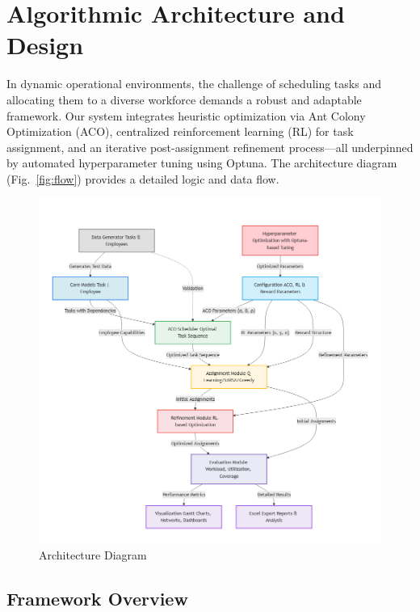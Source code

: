 \documentclass[%
aip,
cp,  %
amsmath,amssymb,
reprint,%
]{revtex4-2}
\begin{document}
	\section{\label{sec:algo}Algorithmic Architecture and Design}
	
	In dynamic operational environments, the challenge of scheduling tasks and allocating them to a diverse workforce demands a robust and adaptable framework. Our system integrates heuristic optimization via Ant Colony Optimization (ACO), centralized reinforcement learning (RL) for task assignment, and an iterative post-assignment refinement process—all underpinned by automated hyperparameter tuning using Optuna. The architecture diagram (Fig.~\ref{fig:flow}) provides a detailed logic and data flow.
	
	\begin{figure}[!hb]
		\centering
		\includegraphics[width=1\linewidth]{figures/overall_architecture.png}
		\caption{\label{fig:arch}Architecture Diagram}
	\end{figure}
	
	\subsection{\label{subsec:framework}Framework Overview}
	
\end{document}
